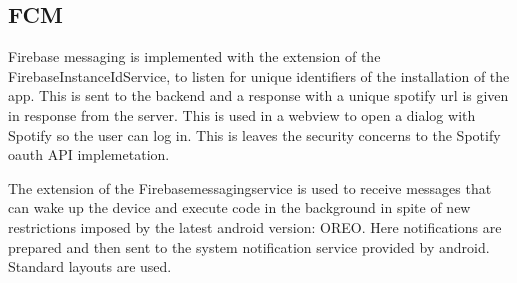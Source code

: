 \subsection{FCM}
Firebase messaging is implemented with the extension of the FirebaseInstanceIdService, to listen for unique identifiers of the installation of the app. This is sent to the backend and a response with a unique spotify url is given in response from the server. This is used in a webview to open a dialog with Spotify so the user can log in. This is leaves the security concerns to the Spotify oauth API implemetation.

The extension of the Firebasemessagingservice is used to receive messages that can wake up the device and execute code in the background in spite of new restrictions imposed by the latest android version: OREO. Here notifications are prepared and then sent to the system notification service provided by android. Standard layouts are used.